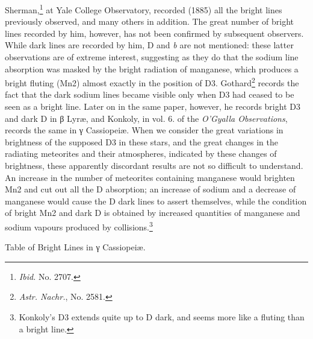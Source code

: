 \documentclass[a4paper, 12pt, oneside, polutonikogreek, english]{article}
\begin{document}
Sherman,\footnote{\emph{Ibid.} No. 2707.} at Yale College Observatory, recorded (1885) all the bright lines previously observed, and many others in addition. The great number of bright lines recorded by him, however, has not been confirmed by subsequent observers. While dark lines are recorded by him, D and \emph{b} are not mentioned: these latter observations are of extreme interest, suggesting as they do that the sodium line absorption was masked by the bright radiation of manganese, which produces a bright fluting (Mn2) almost exactly in the position of D3. Gothard\footnote{\emph{Astr. Nachr.}, No. 2581.} records the fact that the dark sodium lines became visible only when D3 had ceased to be seen as a bright line. Later on in the same paper, however, he records bright D3 and dark D in β Lyræ, and Konkoly, in vol. 6. of the \emph{O'Gyalla Observations}, records the same in γ Cassiopeiæ. When we consider the great variations in brightness of the supposed D3 in these stars, and the great changes in the radiating meteorites and their atmospheres, indicated by these changes of brightness, these apparently discordant results are not so difficult to understand. An increase in the number of meteorites containing manganese would brighten Mn2 and cut out all the D absorption; an increase of sodium and a decrease of manganese would cause the D dark lines to assert themselves, while the condition of bright Mn2 and dark D is obtained by increased quantities of manganese and sodium vapours produced by collisions.\footnote{Konkoly's D3 extends quite up to D dark, and seems more like a fluting than a bright line.}

Table of Bright Lines in γ Cassiopeiæ.
\end{document}
